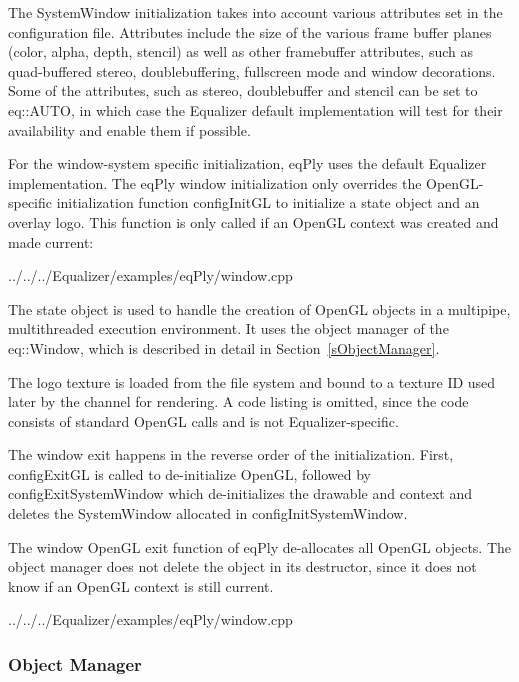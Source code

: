 \documentclass[10pt,a4]{scrartcl}
\newcommand{\sref}[1]{Section~\ref{#1}}
\begin{document}
The \textsf{SystemWindow} initialization takes into account various
attributes set in the configuration file. Attributes include the size of
the various frame buffer planes (color, alpha, depth, stencil) as well
as other framebuffer attributes, such as quad-buffered stereo,
doublebuffering, fullscreen mode and window decorations. Some of the
attributes, such as stereo, doublebuffer and stencil can be set to
\textsf{eq::AUTO}, in which case the Equalizer default implementation
will test for their availability and enable them if possible.

For the window-system specific initialization, \textsf{eqPly} uses the
default Equalizer implementation. The \textsf{eqPly} window
initialization only overrides the OpenGL-specific initialization
function \textsf{configInitGL} to initialize a state object and
an overlay logo. This function is only called if an OpenGL context was
created and made current:

{\footnotesize
  {../../../Equalizer/examples/eqPly/window.cpp}}

The state object is used to handle the creation of OpenGL objects in a
multipipe, multithreaded execution environment. It uses the object manager of
the \textsf{eq::Window}, which is described in detail in \sref{sObjectManager}.

The logo texture is loaded from the file system and bound to a texture ID used
later by the channel for rendering. A code listing is omitted, since the code
consists of standard OpenGL calls and is not Equalizer-specific.

The window exit happens in the reverse order of the initialization. First,
\textsf{configExitGL} is called to de-initialize OpenGL, followed by
\textsf{configExitSystemWindow} which de-initializes the drawable and context
and deletes the \textsf{SystemWindow} allocated in
\textsf{configInitSystemWindow}.

The window OpenGL exit function of \textsf{eqPly} de-allocates all OpenGL
objects. The object manager does not delete the object in its destructor, since
it does not know if an OpenGL context is still current.

{\footnotesize
  {../../../Equalizer/examples/eqPly/window.cpp}}

\subsubsection{\label{sObjectManager}Object Manager}
\end{document}
